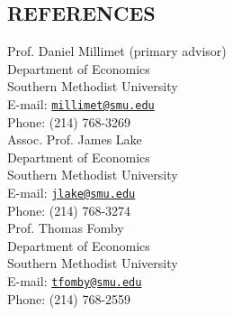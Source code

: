 \documentclass[11pt]{res}
\begin{document}
\begin{resume}
\section{REFERENCES}\vspace{2mm}
Prof. Daniel Millimet (primary advisor)\\
Department of Economics\\
Southern Methodist University\\
E-mail: \href{mailto:millimet@smu.edu}{\texttt{millimet@smu.edu}}\\
Phone: (214) 768-3269\\

\vspace{-5 mm}
Assoc. Prof. James Lake\\
Department of Economics\\
Southern Methodist University\\
E-mail: \href{mailto:jlake@smu.edu}{\texttt{jlake@smu.edu}}\\
Phone: (214) 768-3274\\

\vspace{-5 mm} 
Prof. Thomas Fomby\\
Department of Economics\\
Southern Methodist University\\
E-mail: \href{mailto:tfomby@smu.edu}{\texttt{tfomby@smu.edu}}\\
Phone: (214) 768-2559\\


\end{resume}
\end{document}
